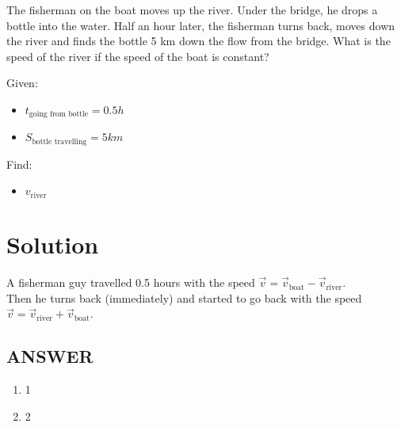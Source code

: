 The fisherman on the boat moves up the river. Under the bridge, he drops a bottle into the water.
Half an hour later, the fisherman turns back, moves down the river and finds the bottle 5 km
down the flow from the bridge. What is the speed of the river if the speed of the boat is constant?

\bigbreak Given: \begin{itemize}
    \item $t_{\text{going from bottle}} = 0.5h$
    \item $S_{\text{bottle travelling}} = 5km$
\end{itemize}

Find: \begin{itemize}
    \item $v_{\text{river}}$
\end{itemize}

\section*{Solution}

A fisherman guy travelled 0.5 hours with the speed $\Vec{v} = \Vec{v}_{\text{boat}} - \Vec{v}_{\text{river}}$.
\\ Then he turns back (immediately) and started to go back with the speed $\Vec{v} = \Vec{v}_{\text{river}} + \Vec{v}_{\text{boat}}$. 



\vfill
\subsection*{ANSWER}
\begin{enumerate}
    \item 1
    \item 2
\end{enumerate}

